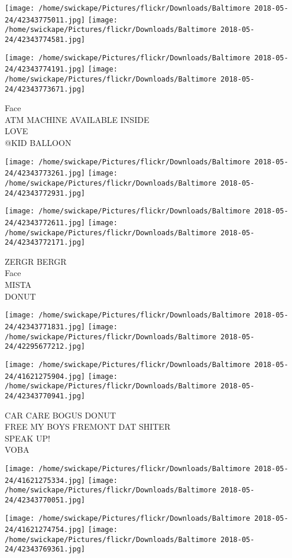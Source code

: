 \documentclass[10pt,letterpaper]{article}
\begin{document}
\texttt{[image: /home/swickape/Pictures/flickr/Downloads/Baltimore 2018-05-24/42343775011.jpg]}
\texttt{[image: /home/swickape/Pictures/flickr/Downloads/Baltimore 2018-05-24/42343774581.jpg]}

\texttt{[image: /home/swickape/Pictures/flickr/Downloads/Baltimore 2018-05-24/42343774191.jpg]}
\texttt{[image: /home/swickape/Pictures/flickr/Downloads/Baltimore 2018-05-24/42343773671.jpg]}

Face\\
ATM MACHINE AVAILABLE INSIDE\\
LOVE\\
@KID BALLOON
\pagebreak

\texttt{[image: /home/swickape/Pictures/flickr/Downloads/Baltimore 2018-05-24/42343773261.jpg]}
\texttt{[image: /home/swickape/Pictures/flickr/Downloads/Baltimore 2018-05-24/42343772931.jpg]}

\texttt{[image: /home/swickape/Pictures/flickr/Downloads/Baltimore 2018-05-24/42343772611.jpg]}
\texttt{[image: /home/swickape/Pictures/flickr/Downloads/Baltimore 2018-05-24/42343772171.jpg]}

ZERGR BERGR\\
Face\\
MISTA\\
DONUT
\pagebreak

\texttt{[image: /home/swickape/Pictures/flickr/Downloads/Baltimore 2018-05-24/42343771831.jpg]}
\texttt{[image: /home/swickape/Pictures/flickr/Downloads/Baltimore 2018-05-24/42295677212.jpg]}

\texttt{[image: /home/swickape/Pictures/flickr/Downloads/Baltimore 2018-05-24/41621275904.jpg]}
\texttt{[image: /home/swickape/Pictures/flickr/Downloads/Baltimore 2018-05-24/42343770941.jpg]}

CAR CARE BOGUS DONUT\\
FREE MY BOYS FREMONT DAT SHITER\\
SPEAK UP!\\
VOBA
\pagebreak

\texttt{[image: /home/swickape/Pictures/flickr/Downloads/Baltimore 2018-05-24/41621275334.jpg]}
\texttt{[image: /home/swickape/Pictures/flickr/Downloads/Baltimore 2018-05-24/42343770051.jpg]}

\texttt{[image: /home/swickape/Pictures/flickr/Downloads/Baltimore 2018-05-24/41621274754.jpg]}
\texttt{[image: /home/swickape/Pictures/flickr/Downloads/Baltimore 2018-05-24/42343769361.jpg]}
\end{document}
